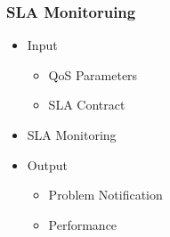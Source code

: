 \documentclass[a4paper]{article}
\begin{document}
\subsubsection{SLA Monitoruing}
\begin{itemize}
	\item Input
	\begin{itemize}
		\item QoS Parameters
		\item SLA Contract
	\end{itemize}
	\item SLA Monitoring
	\item Output
	\begin{itemize}
		\item Problem Notification
		\item Performance
	\end{itemize}
\end{itemize}
\end{document}
